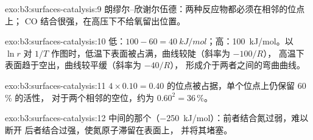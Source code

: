 \begin{solution}{exo:b3:surfaces-catalysis:9}
朗缪尔–欣谢尔伍德：两种反应物都必须在相邻的位点上；
CO 结合很强，在高压下不给氧留出位置。
\end{solution}

\begin{solution}{exo:b3:surfaces-catalysis:10}
低：$100 - 60 = \qty{40}{kJ/mol}$；高：\qty{100}{kJ/mol}。以 $\ln r$ 对
$1/T$ 作图时，低温下表面被占满，曲线较陡（斜率为 $-100/R$），
高温下表面趋于空出，曲线较平缓（斜率为 $-40/R$），
形成介于两者之间的弯曲曲线。
\end{solution}

\begin{solution}{exo:b3:surfaces-catalysis:11}
$4 \times 0.10 = 0.40$ 的位点被占据，单个位点上仍保留 60\,\% 的活性，
对于两个相邻的空位，约为 $0.60^2 = 36\,\%$。
\end{solution}

\begin{solution}{exo:b3:surfaces-catalysis:12}
中间的那个（\qty{-250}{kJ/mol}）：前者结合氮过弱，难以断开 
后者结合过强，使氮原子滞留在表面上，
并将其堵塞。
\end{solution}

